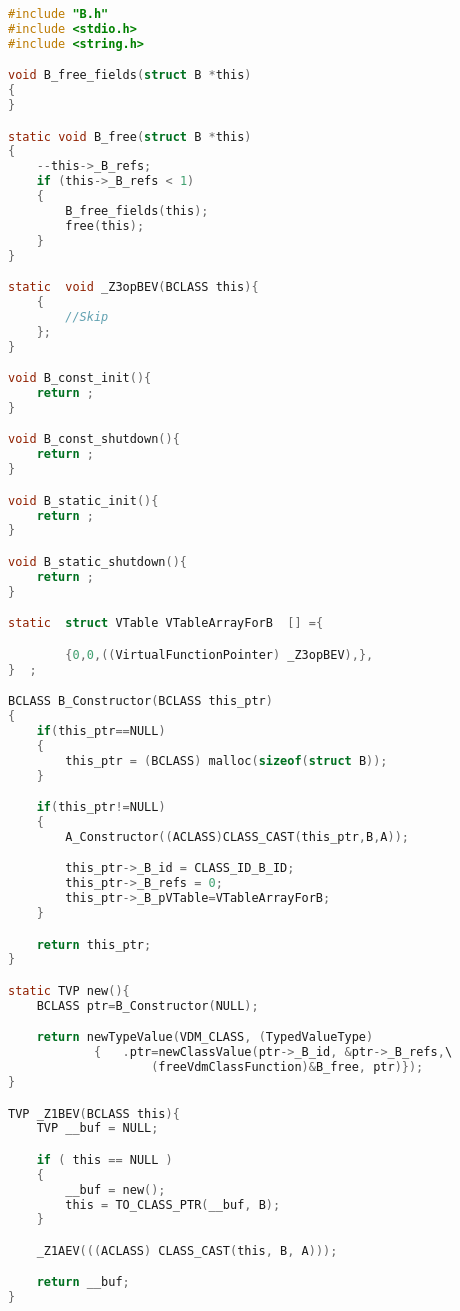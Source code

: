 \begin{lstlisting}[language=C,frame=tlbr,caption="File B.c."]
#include "B.h"
#include <stdio.h>
#include <string.h>

void B_free_fields(struct B *this)
{
}

static void B_free(struct B *this)
{
	--this->_B_refs;
	if (this->_B_refs < 1)
	{
		B_free_fields(this);
		free(this);
	}
}

static  void _Z3opBEV(BCLASS this){
	{
		//Skip
	};
}

void B_const_init(){
	return ;
}

void B_const_shutdown(){
	return ;
}

void B_static_init(){
	return ;
}

void B_static_shutdown(){
	return ;
}

static  struct VTable VTableArrayForB  [] ={

		{0,0,((VirtualFunctionPointer) _Z3opBEV),},
}  ;

BCLASS B_Constructor(BCLASS this_ptr)
{
	if(this_ptr==NULL)
	{
		this_ptr = (BCLASS) malloc(sizeof(struct B));
	}

	if(this_ptr!=NULL)
	{
		A_Constructor((ACLASS)CLASS_CAST(this_ptr,B,A));

		this_ptr->_B_id = CLASS_ID_B_ID;
		this_ptr->_B_refs = 0;
		this_ptr->_B_pVTable=VTableArrayForB;
	}

	return this_ptr;
}

static TVP new(){
	BCLASS ptr=B_Constructor(NULL);

	return newTypeValue(VDM_CLASS, (TypedValueType)
			{	.ptr=newClassValue(ptr->_B_id, &ptr->_B_refs,\
					(freeVdmClassFunction)&B_free, ptr)});
}

TVP _Z1BEV(BCLASS this){
	TVP __buf = NULL;

	if ( this == NULL )
	{
		__buf = new();
		this = TO_CLASS_PTR(__buf, B);
	}

	_Z1AEV(((ACLASS) CLASS_CAST(this, B, A)));

	return __buf;
}

\end{lstlisting}
%
%
%
